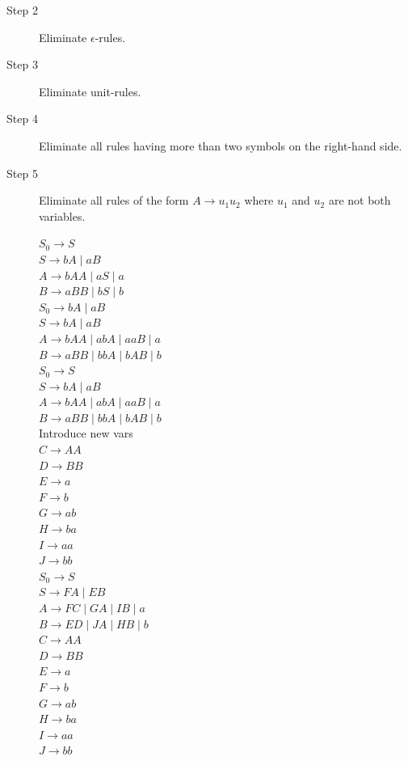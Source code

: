 \documentclass{article}
\begin{document}
\begin{enumerate}
\begin{description}
\item[Step 2] Eliminate $\epsilon$-rules.  

\item[Step 3] Eliminate unit-rules.
  
\item[Step 4] Eliminate all rules having more than two symbols on the
  right-hand side.

\item[Step 5] Eliminate all rules of the form $A\rightarrow u_1u_2$
  where $u_1$ and $u_2$ are not both variables.
  
  $S_0 \rightarrow S$ \\
$S \rightarrow bA \mid aB$ \\
$A \rightarrow bAA \mid aS \mid a$ \\
$B \rightarrow aBB \mid bS \mid b$ \\

$S_0 \rightarrow bA \mid aB$ \\
$S \rightarrow bA \mid aB$ \\
$A \rightarrow bAA \mid abA \mid aaB \mid a$ \\
$B \rightarrow aBB \mid bbA \mid bAB \mid b$ \\

$S_0 \rightarrow S$ \\
$S \rightarrow bA \mid aB$ \\
$A \rightarrow bAA \mid abA \mid aaB \mid a$ \\
$B \rightarrow aBB \mid bbA \mid bAB \mid b$ \\

Introduce new vars\\
$C \rightarrow AA$ \\
$D \rightarrow BB$ \\
$E \rightarrow a$ \\
$F \rightarrow b$ \\
$G \rightarrow ab$ \\
$H \rightarrow ba$ \\
$I \rightarrow aa$ \\
$J \rightarrow bb$ \\

$S_0 \rightarrow S$ \\
$S \rightarrow FA \mid EB$ \\
$A \rightarrow FC \mid GA \mid IB \mid a$ \\
$B \rightarrow ED \mid JA \mid HB \mid b$ \\
$C \rightarrow AA$ \\
$D \rightarrow BB$ \\
$E \rightarrow a$ \\
$F \rightarrow b$ \\
$G \rightarrow ab$ \\
$H \rightarrow ba$ \\
$I \rightarrow aa$ \\
$J \rightarrow bb$ \\

\end{description}
\end{enumerate}
\end{document}
